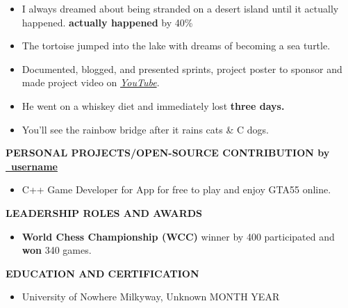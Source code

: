 \documentclass[a4paper,10pt]{article}
\newcommand{\GitHubURL}{\href{https://github.com/username/}{\faGithub \ username}}
\newcommand{\Project}
{\begin{flushleft}\begin{large}\textbf{PERSONAL PROJECTS/OPEN-SOURCE CONTRIBUTION by \GitHubURL\ \hrulefill}\end{large}\end{flushleft}}
\newcommand{\Extra}
{\begin{flushleft}\begin{large}\textbf{LEADERSHIP ROLES AND AWARDS \hrulefill}\end{large}\end{flushleft}}
\newcommand{\Education}
{\begin{flushleft}\begin{large}\textbf{EDUCATION AND CERTIFICATION \hrulefill }\end{large}\end{flushleft}}
\begin{document}
\begin{itemize}
\item I always dreamed about being stranded on a desert island until it actually happened. \textbf{actually happened}  by 40\%

\item The tortoise jumped into the lake with dreams of becoming a sea turtle.

\item Documented, blogged, and presented sprints, project poster to sponsor and made project video on \textit{\href{https:/www.youtube.com}{YouTube}}.

\item He went on a whiskey diet and immediately lost  \textbf{three days.}

\item You'll see the rainbow bridge after it rains cats  \& C dogs.

\end{itemize}\vspace*{5pt}
\vspace*{5pt} \Project
\begin{itemize}
\item C++  Game Developer for   App for free to play and enjoy GTA55 online.
\end{itemize}\vspace*{5pt}
\vspace*{5pt} \Extra
\begin{itemize}
\item \textbf{World Chess Championship (WCC)} winner by  400 participated and \textbf{won} 340 games.

\end{itemize}\vspace*{5pt}
\Education

\begin{itemize}
\item {} \hspace{0.25 in} University of Nowhere \hspace{0.45 in} Milkyway, Unknown \hspace{0.55 in} MONTH YEAR

\end{itemize}
\dotfill
\end{document}

